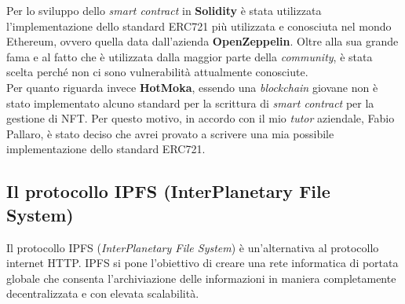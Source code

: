 
Per lo sviluppo dello \textit{smart contract} in \textbf{Solidity} è stata utilizzata l'implementazione dello standard ERC721 più utilizzata e conosciuta nel mondo Ethereum, ovvero quella data dall'azienda \textbf{OpenZeppelin}. Oltre alla sua grande fama e al fatto che è utilizzata dalla maggior parte della \textit{community}, è stata scelta perché non ci sono vulnerabilità attualmente conosciute. \\

Per quanto riguarda invece \textbf{HotMoka}, essendo una \textit{blockchain} giovane non è stato implementato alcuno standard per la scrittura di \textit{smart contract} per la gestione di NFT. Per questo motivo, in accordo con il mio \textit{tutor} aziendale, Fabio Pallaro, è stato deciso che avrei provato a scrivere una mia possibile implementazione dello standard ERC721.


\subsection{Il protocollo IPFS (InterPlanetary File System)}
Il protocollo IPFS (\textit{InterPlanetary File System}) è un'alternativa al protocollo internet HTTP. IPFS si pone l'obiettivo di creare una rete informatica di portata globale che consenta l'archiviazione delle informazioni in maniera completamente decentralizzata e con elevata scalabilità. \\


